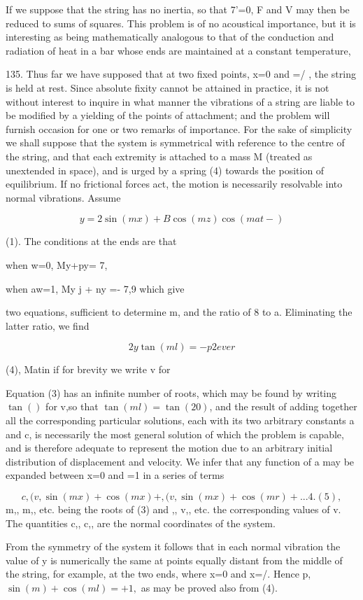 If we suppose that the string has no inertia, so that 7'=0, F and V may then be
reduced to sums of squares. This problem is of no acoustical importance, but it
is interesting as being mathematically analogous to that of the conduction and
radiation of heat in a bar whose ends are maintained at a constant temperature,


135. Thus far we have supposed that at two fixed points, x=0 and =/ , the
string is held at rest. Since absolute fixity cannot be attained in practice,
it is not without interest to inquire in what manner the vibrations of a string
are liable to be modified by a yielding of the points of attachment; and the
problem will furnish occasion for one or two remarks of importance. For the
sake of simplicity we shall suppose that the system is symmetrical with
reference to the centre of the string, and that each extremity is attached to a
mass M (treated as unextended in space), and is urged by a spring (4) towards
the position of equilibrium. If no frictional forces act, the motion is
necessarily resolvable into normal vibrations. Assume

\[y = 2 \sin(mx) + B \cos(mz) \cos(mat - )\]

(1). The conditions at the ends are that

when w=0, My+py= 7,

when aw=1, My j + ny =- 7,9 which give

two equations, sufficient to determine m, and the ratio of 8 to a.  Eliminating
the latter ratio, we find

\[2y \tan(ml) = -p2 ever\]

(4), Matin if for brevity we write v for

Equation (3) has an infinite number of roots, which may be found by writing \(
\tan() \) for v,so that \(\tan(ml) = \tan(20) \), and the result of adding
together all the corresponding particular solutions, each with its two
arbitrary constants a and c, is necessarily the most general solution of which
the problem is capable, and is therefore adequate to represent the motion due
to an arbitrary initial distribution of displacement and velocity. We infer
that any function of a may be expanded between x=0 and =1 in a series of terms

\[c, (v, \sin(m x) + \cos(mx) + , (v, \sin(mx) + \cos(mr) +...4.(5),\]
 m,, m,,
etc. being the roots of (3) and ,, v,, etc. the corresponding values of v. The
quantities c,, c,, are the normal coordinates of the system.

From the symmetry of the system it follows that in each normal vibration the
value of y is numerically the same at points equally distant from the middle of
the string, for example, at the two ends, where x=0 and x=/. Hence p, \(\sin(m)
+ \cos(ml) =+1,\) as may be proved also from (4).


